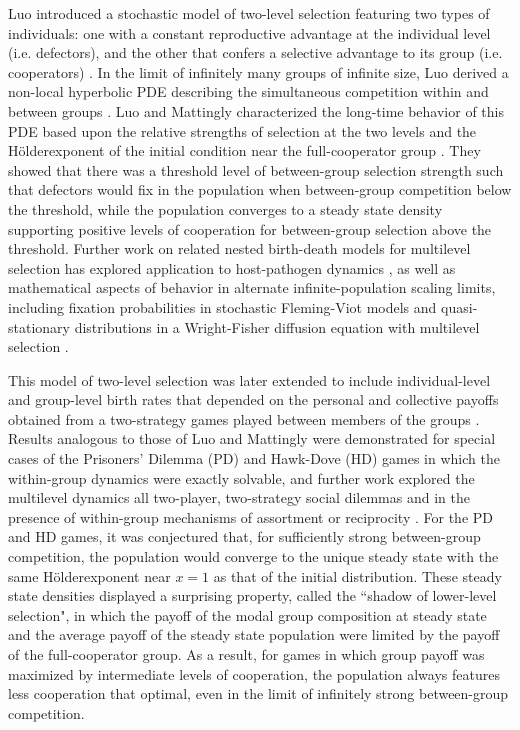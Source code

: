 \documentclass[11pt]{article}
\numberwithin{equation}{section}
\newcommand{\myindent}{\hspace{10mm}}
\newcommand{\holder}{H{\"o}lder\:}
\begin{document}
{\myindent Luo introduced a stochastic model of two-level selection featuring two types of individuals: one with a constant reproductive advantage at the individual level (i.e. defectors), and the other that confers a selective advantage to its group (i.e. cooperators) \cite{luo2014unifying,van2014simple}. In the limit of infinitely many groups of infinite size, Luo derived a non-local hyperbolic PDE describing the simultaneous competition within and between groups \cite{luo2014unifying}. Luo and Mattingly characterized the long-time behavior of this PDE based upon the relative strengths of selection at the two levels and the \holder exponent of the initial condition near the full-cooperator group \cite{luo2017scaling}. They showed that there was a threshold level of between-group selection strength such that defectors would fix in the population when between-group competition below the threshold, while the population converges to a steady state density supporting positive levels of cooperation for between-group selection above the threshold. Further work on related nested birth-death models for multilevel selection has explored application to host-pathogen dynamics \cite{pokalyuk2019diversity,pokalyuk2019maintenance,osorio2020two}, as well as mathematical aspects of behavior in alternate infinite-population scaling limits, including fixation probabilities in stochastic Fleming-Viot models \cite{luo2017scaling,dawson2013multilevel,meizis2020convergence} and quasi-stationary distributions in a Wright-Fisher diffusion equation with multilevel selection \cite{velleret2019two, velleret2020individual}.


 \myindent This model of two-level selection was later extended to include individual-level and group-level birth rates that depended on the personal and collective payoffs obtained from a two-strategy games played between members of the groups \cite{cooney2019replicator}. Results analogous to those of Luo and Mattingly were demonstrated for special cases of the Prisoners' Dilemma (PD) and Hawk-Dove (HD) games in which the within-group dynamics were exactly solvable, and further work explored the multilevel dynamics all two-player, two-strategy social dilemmas \cite{cooney2020analysis} and in the presence of within-group mechanisms of assortment or reciprocity \cite{cooney2019assortment}. For the PD and HD games, it was conjectured that, for sufficiently strong between-group competition, the population would converge to the unique steady state with the same \holder exponent near $x=1$ as that of the initial distribution. These steady state densities displayed a surprising property, called the ``shadow of lower-level selection", in which the payoff of the modal group composition at steady state and the average payoff of the steady state population were limited by the payoff of the full-cooperator group. As a result, for games in which group payoff was maximized by intermediate levels of cooperation, the population always features less cooperation that optimal, even in the limit of infinitely strong between-group competition. 


}
\end{document}
